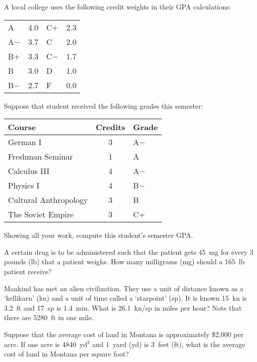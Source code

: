 \documentclass[12pt,letterpaper]{exam}
\begin{document}
\begin{questions}
\newpage
\question[10] A local college uses the following credit weights in their GPA calculations:
	\begin{table}[!ht]
	\centering
	\begin{tabular}{lr|lr}
	A & 4.0 & C+ & 2.3 \\
	A$-$ & 3.7 & C & 2.0 \\
	B+ & 3.3 & C$-$ & 1.7 \\
	B & 3.0 & D & 1.0 \\
	B$-$ & 2.7 & F & 0.0
	\end{tabular}
	\end{table} \par
Suppose that student received the following grades this semester:
	\begin{table}[!ht]
	\centering
	\begin{tabular}{lcl}
	Course & Credits & Grade \\ \hline
	German I & 3 & A$-$ \\
	Freshman Seminar & 1 & A \\
	Calculus III & 4 & A$-$ \\
	Physics I & 4 & B$-$ \\
	Cultural Anthropology & 3 & B \\
	The Soviet Empire & 3 & C+
	\end{tabular}
	\end{table} \par
Showing all your work, compute this student's semester GPA. 



\newpage
\question[10] A certain drug is to be administered such that the patient gets 45~mg for every 3 pounds (lb) that a patient weighs. How many milligrams (mg) should a 165~lb patient receive? 



\newpage
\question[10] Mankind has met an alien civilization. They use a unit of distance known as a `kellikarn' (kn) and a unit of time called a `starpoint' (sp). It is known 15~kn is 3.2~ft and 17~sp is 1.4~min. What is 26.1~kn/sp in miles per hour? Note that there are 5280~ft in one mile. 



\newpage
\question[10] Suppose that the average cost of land in Montana is approximately \$2,000 per acre. If one acre is 4840~yd$^2$ and 1~yard (yd) is 3~feet (ft), what is the average cost of land in Montana per square foot?


\end{questions}
\end{document}
